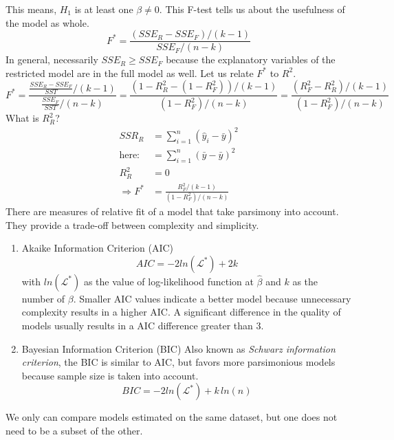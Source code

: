 			This means, $H_1$ is at least one $\beta\neq 0$. This F-test tells us about the usefulness of the model as whole.
			\begin{equation*}
				F^*=\frac{(SSE_R-SSE_F)/(k-1)}{SSE_F/(n-k)}
			\end{equation*}
			In general, necessarily $SSE_R\geq SSE_F$ because the explanatory variables of the restricted model are in the full model as well. Let us relate $F^*$ to $R^2$.
			\begin{equation*}
				F^*=\frac{\frac{SSE_R-SSE_F}{SST}/(k-1)}{\frac{SSE_F}{SST}/(n-k)}=\frac{\left(1-R^2_R-(1-R^2_F)\right)/(k-1)}{(1-R^2_F)/(n-k)}=\frac{(R^2_F-R^2_R)/(k-1)}{(1-R_F^2)/(n-k)}
			\end{equation*}
			What is $R^2_R$?
			\begin{align*}
				SSR_R&=\sum\limits_{i=1}^n (\hat{y}_i-\bar{y})^2\\
				\text{here: }&=\sum\limits_{i=1}^n (\bar{y}-\bar{y})^2\\
				R^2_R&=0\\
				\Rightarrow F^*&= \frac{R^2_F / (k-1)}{(1-R^2_F)/(n-k)}
			\end{align*}
			There are measures of relative fit of a model that take parsimony into account. They provide a trade-off between complexity and simplicity.
			\begin{enumerate}
				\item Akaike Information Criterion (AIC)
					\begin{equation*}
						AIC=-2 ln(\mathcal{L}^*)+2k
					\end{equation*}
					with $ln(\mathcal{L}^*)$ as the value of log-likelihood function at $\hat{\beta}$ and $k$ as the number of $\beta$. Smaller AIC values indicate a better model because unnecessary complexity results in a higher AIC. A significant difference in the quality of models usually results in a AIC difference greater than 3.
				\item Bayesian Information Criterion (BIC)
					Also known as \textit{Schwarz information criterion}, the BIC is similar to AIC, but favors more parsimonious models because sample size is taken into account.
					\begin{equation*}
						BIC=-2 ln(\mathcal{L}^*)+k\,ln(n)
					\end{equation*} 
			\end{enumerate}
			We only can compare models estimated on the same dataset, but one does not need to be a subset of the other.
